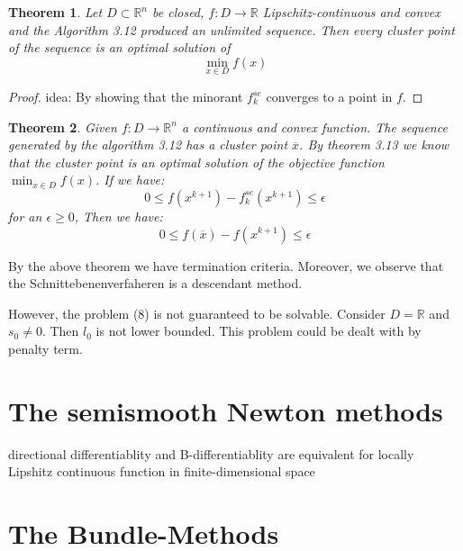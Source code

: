 \documentclass[a4paper,11pt,fleqn, draft]{book}
\newtheorem{theorem}{Theorem}[section]
\theoremstyle{definition}
\theoremstyle{remark}
\begin{document}
\begin{theorem}
	Let $ D \subset \mathbb{R}^n$  be closed, $f: D \longrightarrow \mathbb{R}$ Lipschitz-continuous and convex and the Algorithm 3.12 produced an unlimited sequence. Then every cluster point of the sequence is an optimal solution of
		\begin{equation*}
			\min_{x \in D} f(x)
		\end{equation*}
\end{theorem}

\begin{proof}
	idea: By showing that the minorant $f^{se}_k$ converges to a point in $f$.
\end{proof}


\begin{theorem}
	Given $f: D \longrightarrow \mathbb{R}^n$ a continuous and convex function. The sequence generated by the algorithm 3.12 has a cluster point $\overline{x}$. By theorem 3.13 we know that the cluster point is an optimal solution of the objective function $\min_{x \in D} f(x)$. If we have:
	\begin{equation*}
		0 \leq f(x^{k + 1}) - f^{se}_k(x^{k+1}) \leq \epsilon
	\end{equation*}
	for an $\epsilon \geq 0$,
	Then we have:
	\begin{equation*}
		0 \leq f(\overline{x}) - f(x^{k + 1}) \leq \epsilon
	\end{equation*}
\end{theorem}

By the above theorem we have termination criteria. Moreover, we observe that the Schnittebenenverfaheren is a descendant method. \par 
However, the problem (8) is not guaranteed to be solvable. Consider $D = \mathbb{R}$ and $s_0 \neq 0$. Then $l_0$ is not lower bounded. This problem could be dealt with by penalty term.  

\section{The semismooth Newton methods}




directional differentiablity and B-differentiablity are equivalent for locally Lipshitz continuous function in finite-dimensional space

\section{The Bundle-Methods}
\end{document}
